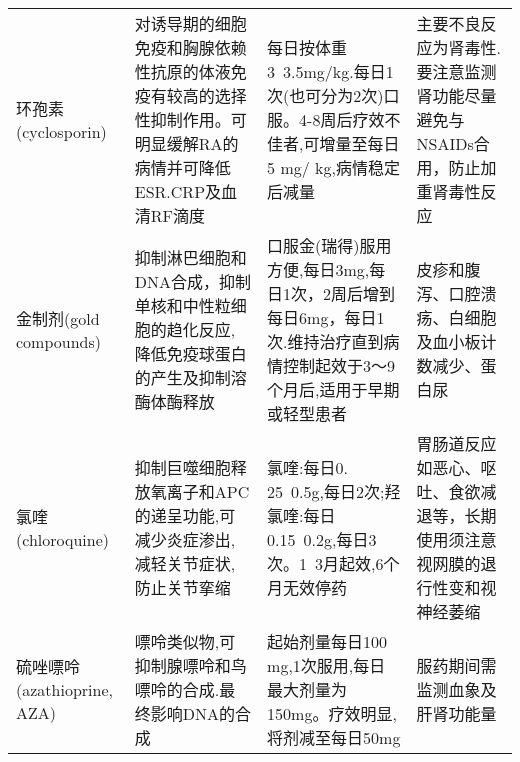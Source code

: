 \begin{longtable}[]{p{3cm}p{4cm}p{4cm}p{4cm}}
    \\
    环孢素(cyclosporin)                                                                                                                                                                        & 对诱导期的细胞免疫和胸腺依赖性抗原的体液免疫有较高的选择性抑制作用。可明显缓解RA的病情并可降低ESR.CRP及血清RF滴度                       & 每日按体重3~3.5mg/kg.每日1次(也可分为2次)口服。4-8周后疗效不佳者,可增量至每日5 mg/ kg,病情稳定后减量                                                                               & 主要不良反应为肾毒性.要注意监测肾功能尽量避免与NSAIDs合用，防止加重肾毒性反应
    \\
    金制剂(gold compounds)                                                                                                                                                                     & 抑制淋巴细胞和DNA合成，抑制单核和中性粒细胞的趋化反应,降低免疫球蛋白的产生及抑制溶酶体酶释放                                            & 口服金(瑞得)服用方便,每日3mg,每日1次，2周后增到每日6mg，每日1次.维持治疗直到病情控制起效于3～9个月后,适用于早期或轻型患者                                                          & 皮疹和腹泻、口腔溃疡、白细胞及血小板计数减少、蛋白尿                                                                                         \\
    氯喹(chloroquine)                                                                                                                                                                          & 抑制巨噬细胞释放氧离子和APC的递呈功能,可减少炎症渗出,减轻关节症状,防止关节挛缩                                                          & 氯喹:每日0. 25~0.5g,每日2次;羟氯喹:每日0.15~0.2g,每日3次。1~3月起效,6个月无效停药                                                                                                  & 胃肠道反应如恶心、呕吐、食欲减退等，长期使用须注意视网膜的退行性变和视神经萎缩
    \\
    硫唑嘌呤(azathioprine, AZA)                                                                                                                                                                & 嘌呤类似物,可抑制腺嘌呤和鸟嘌呤的合成.最终影响DNA的合成                                                                                 & 起始剂量每日100 mg,1次服用,每日最大剂量为150mg。疗效明显,将剂减至每日50mg                                                                                                          & 服药期间需监测血象及肝肾功能量
    \\

\end{longtable}
